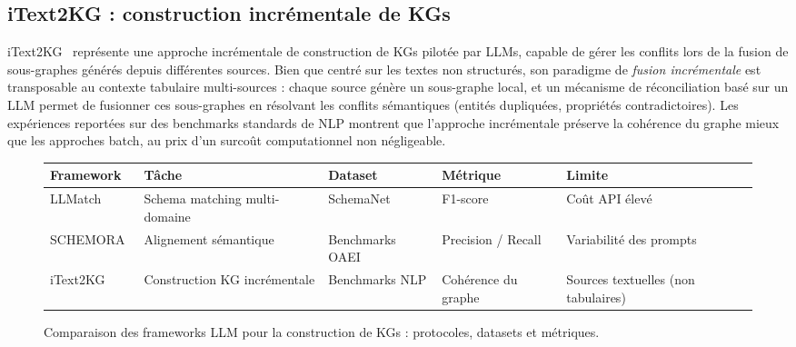 \subsection{iText2KG : construction incrémentale de KGs}
iText2KG~\cite{itext2kg2024} représente une approche incrémentale de construction de KGs pilotée par LLMs, capable de gérer les conflits lors de la fusion de sous-graphes générés depuis différentes sources. Bien que centré sur les textes non structurés, son paradigme de \textit{fusion incrémentale} est transposable au contexte tabulaire multi-sources : chaque source génère un sous-graphe local, et un mécanisme de réconciliation basé sur un LLM permet de fusionner ces sous-graphes en résolvant les conflits sémantiques (entités dupliquées, propriétés contradictoires). Les expériences reportées sur des benchmarks standards de NLP montrent que l'approche incrémentale préserve la cohérence du graphe mieux que les approches batch, au prix d'un surcoût computationnel non négligeable.

\begin{figure}[ht]
    \centering
    \begin{center}
    \begin{tabular}{|p{2.5cm}|p{3cm}|p{2.5cm}|p{2cm}|p{3.5cm}|}
    \hline
    \textbf{Framework} & \textbf{Tâche} & \textbf{Dataset} & \textbf{Métrique} & \textbf{Limite} \\
    \hline
    LLMatch~\cite{llmatch2025} & Schema matching multi-domaine & SchemaNet & F1-score & Coût API élevé \\
    \hline
    SCHEMORA~\cite{schemora2025} \hspace{2cm} & Alignement sémantique & Benchmarks OAEI & Precision / Recall  & Variabilité des prompts \\
    \hline
    iText2KG~\cite{itext2kg2024} & Construction KG incrémentale & Benchmarks NLP & Cohérence du graphe & Sources textuelles (non tabulaires) \\
    \hline
    \end{tabular}
    \end{center}
    \caption{Comparaison des frameworks LLM pour la construction de KGs : protocoles, datasets et métriques.}
    \label{tab:comparaison_llm}
\end{figure}

